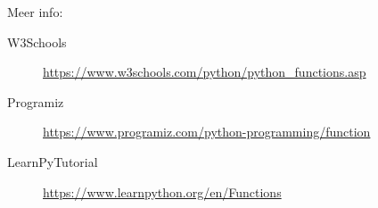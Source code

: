 Meer info:
\begin{description}
\item [W3Schools] \url{https://www.w3schools.com/python/python_functions.asp}
\item [Programiz] \url{https://www.programiz.com/python-programming/function}
\item [LearnPyTutorial] \url{https://www.learnpython.org/en/Functions}
\end{description}

